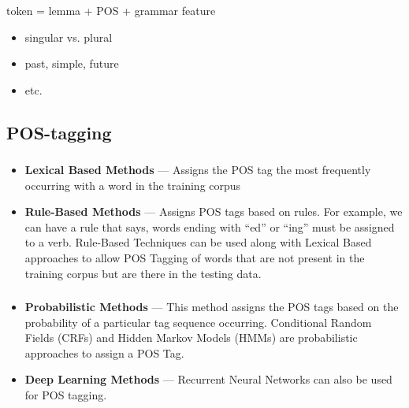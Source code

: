\documentclass[t, 10pt]{beamer}
\begin{document}
\begin{frame} %
	\frametitle{\insertsection}
	\frametitle{\insertsubsection}
	
 token = lemma + POS + grammar feature
 	 
 	 \vspace{0.5cm}
 	 
 \begin{itemize}
 	\item singular vs. plural
 	\item past, simple, future 
 	\item etc.
 \end{itemize}
\end{frame}
	
		\subsection{POS-tagging} \label{l2}
		\begin{frame} %
			\frametitle{\insertsection}
			\frametitle{\insertsubsection}
			\begin{itemize}
				\item \textbf{Lexical Based Methods} — Assigns the POS tag the most frequently occurring with a word in the training corpus
				\item \textbf{Rule-Based Methods} — Assigns POS tags based on rules. For example, we can have a rule that says, words ending with “ed” or “ing” must be assigned to a verb. Rule-Based Techniques can be used along with Lexical Based approaches to allow POS Tagging of words that are not present in the training corpus but are there in the testing data.
		\end{itemize}
\end{frame}


\begin{frame} %
	\frametitle{\insertsection}
	\frametitle{\insertsubsection}
	\begin{itemize}
		\item \textbf{Probabilistic Methods} — This method assigns the POS tags based on the probability of a particular tag sequence occurring. Conditional Random Fields (CRFs) and Hidden Markov Models (HMMs) are probabilistic approaches to assign a POS Tag.
		\item \textbf{Deep Learning Methods} — Recurrent Neural Networks can also be used for POS tagging.
	\end{itemize}
\end{frame}
\end{document}
